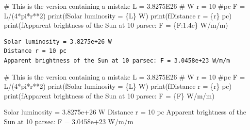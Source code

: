 \documentclass[
  letterpaper,
  DIV=11,
  numbers=noendperiod]{scrreprt}
\newenvironment{Shaded}{\begin{snugshade}}{\end{snugshade}}
\newcommand{\BuiltInTok}[1]{\textcolor[rgb]{0.00,0.23,0.31}{#1}}
\newcommand{\CommentTok}[1]{\textcolor[rgb]{0.37,0.37,0.37}{#1}}
\newcommand{\DecValTok}[1]{\textcolor[rgb]{0.68,0.00,0.00}{#1}}
\newcommand{\FloatTok}[1]{\textcolor[rgb]{0.68,0.00,0.00}{#1}}
\newcommand{\NormalTok}[1]{\textcolor[rgb]{0.00,0.23,0.31}{#1}}
\newcommand{\OperatorTok}[1]{\textcolor[rgb]{0.37,0.37,0.37}{#1}}
\newcommand{\SpecialCharTok}[1]{\textcolor[rgb]{0.37,0.37,0.37}{#1}}
\newcommand{\SpecialStringTok}[1]{\textcolor[rgb]{0.13,0.47,0.30}{#1}}
\begin{document}
\begin{Shaded}
\begin{Highlighting}[]
\CommentTok{\# This is the version containing a mistake}
\NormalTok{L }\OperatorTok{=} \FloatTok{3.8275E26} \CommentTok{\# W}
\NormalTok{r }\OperatorTok{=} \DecValTok{10} \CommentTok{\#pc}
\NormalTok{F }\OperatorTok{=}\NormalTok{ L}\OperatorTok{/}\NormalTok{(}\DecValTok{4}\OperatorTok{*}\NormalTok{pi}\OperatorTok{*}\NormalTok{r}\OperatorTok{**}\DecValTok{2}\NormalTok{)}
\BuiltInTok{print}\NormalTok{(}\SpecialStringTok{f\textquotesingle{}Solar luminosity = }\SpecialCharTok{\{}\NormalTok{L}\SpecialCharTok{\}}\SpecialStringTok{ W\textquotesingle{}}\NormalTok{)}
\BuiltInTok{print}\NormalTok{(}\SpecialStringTok{f\textquotesingle{}Distance r = }\SpecialCharTok{\{}\NormalTok{r}\SpecialCharTok{\}}\SpecialStringTok{ pc\textquotesingle{}}\NormalTok{)}
\BuiltInTok{print}\NormalTok{(}\SpecialStringTok{f\textquotesingle{}Apparent brightness of the Sun at 10 parsec: F = }\SpecialCharTok{\{}\NormalTok{F}\SpecialCharTok{:1.4e\}}\SpecialStringTok{ W/m/m\textquotesingle{}}\NormalTok{)}
\end{Highlighting}
\end{Shaded}

\begin{verbatim}
Solar luminosity = 3.8275e+26 W
Distance r = 10 pc
Apparent brightness of the Sun at 10 parsec: F = 3.0458e+23 W/m/m
\end{verbatim}

\begin{Shaded}
\begin{Highlighting}[]
\CommentTok{\# This is the version containing a mistake}
\NormalTok{L }\OperatorTok{=} \FloatTok{3.8275E26} \CommentTok{\# W}
\NormalTok{r }\OperatorTok{=} \DecValTok{10} \CommentTok{\#pc}
\NormalTok{F }\OperatorTok{=}\NormalTok{ L}\OperatorTok{/}\NormalTok{(}\DecValTok{4}\OperatorTok{*}\NormalTok{pi}\OperatorTok{*}\NormalTok{r}\OperatorTok{**}\DecValTok{2}\NormalTok{)}
\BuiltInTok{print}\NormalTok{(}\SpecialStringTok{f\textquotesingle{}Solar luminosity = }\SpecialCharTok{\{}\NormalTok{L}\SpecialCharTok{\}}\SpecialStringTok{ W\textquotesingle{}}\NormalTok{)}
\BuiltInTok{print}\NormalTok{(}\SpecialStringTok{f\textquotesingle{}Distance r = }\SpecialCharTok{\{}\NormalTok{r}\SpecialCharTok{\}}\SpecialStringTok{ pc\textquotesingle{}}\NormalTok{)}
\BuiltInTok{print}\NormalTok{(}\SpecialStringTok{f\textquotesingle{}Apparent brightness of the Sun at 10 parsec: F = }\SpecialCharTok{\{}\NormalTok{F}\SpecialCharTok{\}}\SpecialStringTok{ W/m/m\textquotesingle{}}\NormalTok{)}

\NormalTok{Solar luminosity }\OperatorTok{=} \FloatTok{3.8275e+26}\NormalTok{ W}
\NormalTok{Distance r }\OperatorTok{=} \DecValTok{10}\NormalTok{ pc}
\NormalTok{Apparent brightness of the Sun at }\DecValTok{10}\NormalTok{ parsec: F }\OperatorTok{=} \FloatTok{3.0458e+23}\NormalTok{ W}\OperatorTok{/}\NormalTok{m}\OperatorTok{/}\NormalTok{m}
\end{Highlighting}
\end{Shaded}
\end{document}
